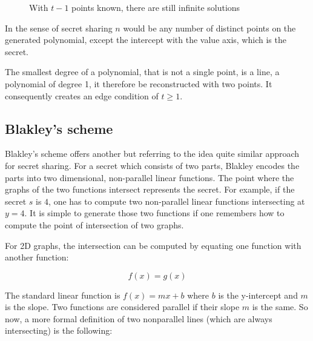 \begin{figure}
  \centering
  \caption{With $t-1$ points known, there are still infinite solutions}
\end{figure}

In the sense of secret sharing $n$ would be any number of distinct points on
the generated polynomial, except the intercept with the value axis, which is
the secret.

The smallest degree of a polynomial, that is not a single point, is a line, a
polynomial of degree 1, it therefore be reconstructed with two points. It
consequently creates an edge condition of $t \geq 1$.

\subsection{Blakley's scheme}

Blakley's scheme offers another but referring to the idea quite similar
approach for secret sharing. For a secret which consists of two parts, 
Blakley encodes the parts into two dimensional, non-parallel linear functions.
The point where the graphs of the two functions intersect represents the
secret. For example, if the secret $s$ is $4$, one has to compute two non-parallel
linear functions intersecting at $y = 4$. It is simple to generate those two
functions if one remembers how to compute the point of intersection of two graphs.

For 2D graphs, the intersection can be computed by equating one function with
another function:

$$f(x) = g(x)$$

The standard linear function is $f(x) = mx + b$ where $b$ is the y-intercept and
$m$ is the slope. Two functions are considered parallel if their slope $m$ is 
the same. So now, a more formal definition of two nonparallel lines (which are
always intersecting) is the following:

